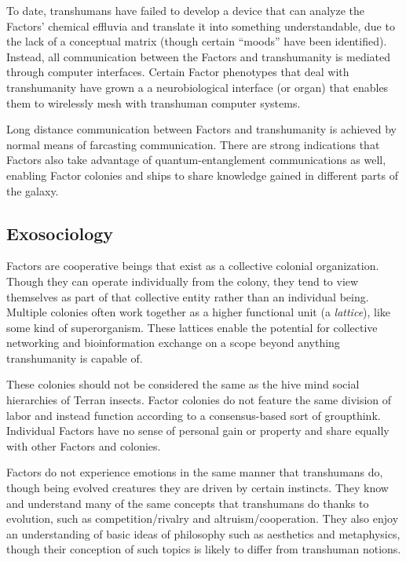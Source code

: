 To date, transhumans have failed to develop a device 
that can analyze the Factors' chemical effluvia and 
translate it into something understandable, due to the 
lack of a conceptual matrix (though certain ``moods'' 
have been identified). Instead, all communication 
between the Factors and transhumanity is mediated 
through computer interfaces. Certain Factor phenotypes
that deal with transhumanity have grown a a
neurobiological interface (or organ) that enables them 
to wirelessly mesh with transhuman computer systems.

Long distance communication between Factors 
and transhumanity is achieved by normal means of 
farcasting communication. There are strong indications
that Factors also take advantage of quantum-entanglement
communications as well, enabling
Factor colonies and ships to share knowledge gained 
in different parts of the galaxy. 

\subsection{Exosociology}

Factors are cooperative beings that exist as a collective
colonial organization. Though they can operate
individually from the colony, they tend to view
themselves as part of that collective entity rather than 
an individual being. Multiple colonies often work together
as a higher functional unit (a \textit{lattice}), like some
kind of superorganism. These lattices enable the potential
for collective networking and bioinformation
exchange on a scope beyond anything transhumanity 
is capable of. 

These colonies should not be considered the same 
as the hive mind social hierarchies of Terran insects. 
Factor colonies do not feature the same division of 
labor and instead function according to a consensus-based
sort of groupthink. Individual Factors have no
sense of personal gain or property and share equally 
with other Factors and colonies. 

Factors do not experience emotions in the same 
manner that transhumans do, though being evolved 
creatures they are driven by certain instincts. They 
know and understand many of the same concepts that 
transhumans do thanks to evolution, such as competition/rivalry
and altruism/cooperation. They also enjoy
an understanding of basic ideas of philosophy such as 
aesthetics and metaphysics, though their conception of 
such topics is likely to differ from transhuman notions.

